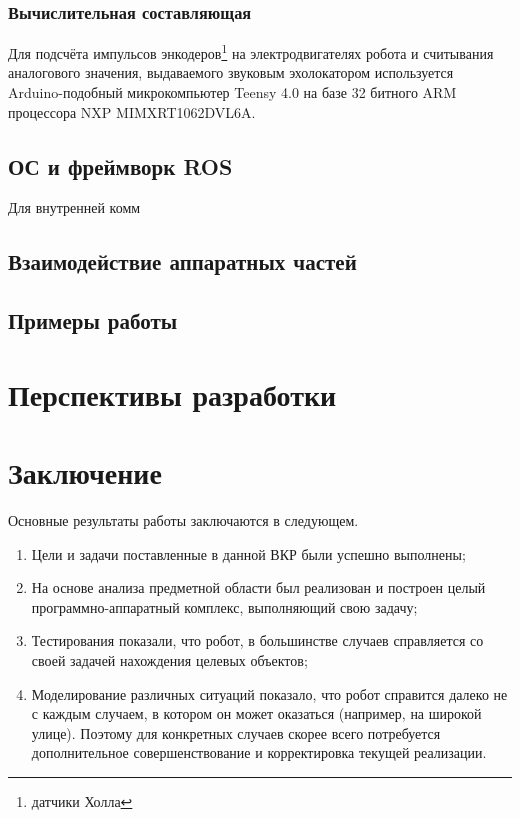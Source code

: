\documentclass[12pt,a4paper]{scrartcl}
\begin{document}
				\subsubsection{Вычислительная составляющая}
					Для подсчёта импульсов энкодеров\footnote{датчики Холла} на электродвигателях робота и считывания аналогового значения, выдаваемого звуковым эхолокатором используется Arduino-подобный микрокомпьютер Teensy 4.0 на базе 32 битного ARM процессора NXP MIMXRT1062DVL6A\cite{bib:TeensyDesc}. 
			\subsection{ОС и фреймворк ROS}
				Для внутренней комм
			\subsection{Взаимодействие аппаратных частей}
			\subsection{Примеры работы}
			
		\section{Перспективы разработки} \label{sec:perspective}
			
			
		\section*{Заключение}
			Основные результаты работы заключаются в следующем.
			\begin{enumerate}
				\item Цели и задачи поставленные в данной ВКР были успешно выполнены;
				\item На основе анализа предметной области был реализован и построен целый программно-аппаратный комплекс, выполняющий свою задачу;
				\item Тестирования показали, что робот, в большинстве случаев справляется со своей задачей нахождения целевых объектов;
				\item Моделирование различных ситуаций показало, что робот справится далеко не с каждым случаем, в котором он может оказаться (например, на широкой улице). Поэтому для конкретных случаев скорее всего потребуется дополнительное совершенствование и корректировка текущей реализации.
			\end{enumerate}
			
\end{document}
